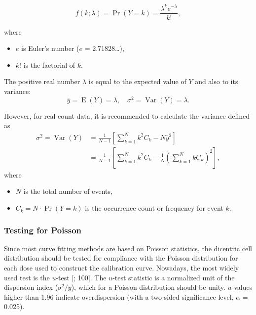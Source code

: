 \documentclass[]{scrartcl}
\providecommand{\tightlist}{%
  \setlength{\itemsep}{0pt}\setlength{\parskip}{0pt}}
\begin{document}
\begin{equation}
    f(k; \lambda) = \Pr(Y = k)= \frac{\lambda^k e^{-\lambda}}{k!},
    \label{eq:poisson-dist}
\end{equation}

where

\begin{itemize}
\tightlist
\item
  \(e\) is Euler's number (\(e\) = 2.71828\ldots),
\item
  \(k\)! is the factorial of \(k\).
\end{itemize}

The positive real number \(\lambda\) is equal to the expected value of \(Y\) and also to its variance:
\begin{equation}
    \bar{y} = \operatorname{E}(Y) = \lambda, \quad \sigma^{2} = \operatorname{Var}(Y) = \lambda.
    \label{eq:variance-poisson}
\end{equation}

However, for real count data, it is recommended to calculate the variance defined as
\begin{equation}
\begin{aligned}
  \sigma^{2} = \operatorname{Var}(Y)
  &= \frac{1}{N - 1} \left[ \sum_{k=1}^{N} k^{2} C_{k} - N \bar{y}^{2} \right] \\
  &= \frac{1}{N - 1} \left[  \sum_{k=1}^{N} k^{2} C_{k} - \frac{1}{N} \left( \sum_{k=1}^{N} k C_{k} \right)^{2} \right]
  ,
\end{aligned}
  \label{eq:variance}
\end{equation}
where

\begin{itemize}
\tightlist
\item
  \(N\) is the total number of events,
\item
  \(C_{k} = N \cdot \Pr(Y = k)\) is the occurrence count or frequency for event \(k\).
\end{itemize}

\hypertarget{testing-for-poisson}{%
\subsubsection{Testing for Poisson}\label{testing-for-poisson}}

Since most curve fitting methods are based on Poisson statistics, the dicentric cell distribution should be tested for compliance with the Poisson distribution for each dose used to construct the calibration curve. Nowadays, the most widely used test is the \(u\)-test {[}\citet{Rao1956}; 100{]}. The \(u\)-test statistic is a normalized unit of the dispersion index (\(\sigma^{2}/\bar{y}\)), which for a Poisson distribution should be unity. \(u\)-values higher than 1.96 indicate overdispersion (with a two-sided significance level, \(\alpha\) = 0.025).
\end{document}
